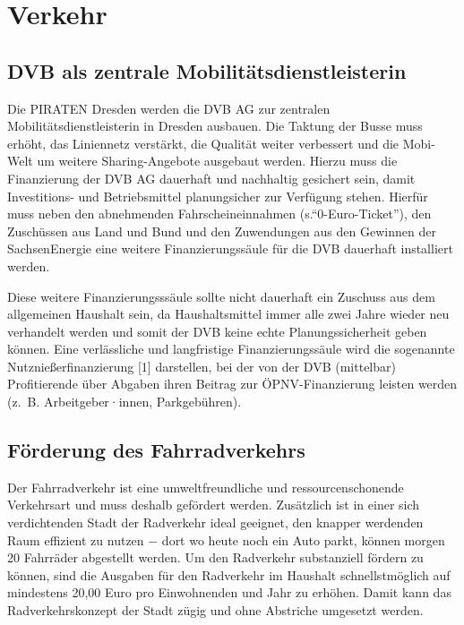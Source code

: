 \documentclass[a4paper, 11pt]{article}
\begin{document}
\section{Verkehr}

\subsection{DVB als zentrale Mobilitätsdienstleisterin}
Die PIRATEN Dresden werden die DVB AG zur zentralen Mobilitätsdienstleisterin in Dresden ausbauen. Die Taktung der Busse muss erhöht, das Liniennetz verstärkt, die Qualität weiter verbessert und die Mobi-Welt um weitere Sharing-Angebote ausgebaut werden. Hierzu muss die Finanzierung der DVB AG dauerhaft und nachhaltig gesichert sein, damit Investitions- und Betriebsmittel planungsicher zur Verfügung stehen. Hierfür muss neben den abnehmenden Fahrscheineinnahmen (s.``0-Euro-Ticket''), den Zuschüssen aus Land und Bund und den Zuwendungen aus den Gewinnen der SachsenEnergie eine weitere Finanzierungssäule für die DVB dauerhaft installiert werden.\newline

Diese weitere Finanzierungsssäule sollte nicht dauerhaft ein Zuschuss aus dem allgemeinen Haushalt sein, da Haushaltsmittel immer alle zwei Jahre wieder neu verhandelt werden und somit der DVB keine echte Planungssicherheit geben können. Eine verlässliche und langfristige Finanzierungssäule wird die sogenannte Nutznießerfinanzierung [1] darstellen, bei der von der DVB (mittelbar) Profitierende über Abgaben ihren Beitrag zur ÖPNV-Finanzierung leisten werden (z. B. Arbeitgeber·innen, Parkgebühren).



\subsection{Förderung des Fahrradverkehrs}
Der Fahrradverkehr ist eine umweltfreundliche und ressourcenschonende Verkehrsart und muss deshalb gefördert werden. Zusätzlich ist in einer sich verdichtenden Stadt der Radverkehr ideal geeignet, den knapper werdenden Raum effizient zu nutzen $-$ dort wo heute noch ein Auto parkt, können morgen 20 Fahrräder abgestellt werden. Um den Radverkehr substanziell fördern zu können, sind die Ausgaben für den Radverkehr im Haushalt schnellstmöglich auf mindestens 20,00 Euro pro Einwohnenden und Jahr zu erhöhen. Damit kann das Radverkehrskonzept der Stadt zügig und ohne Abstriche umgesetzt werden.\newline
\end{document}
